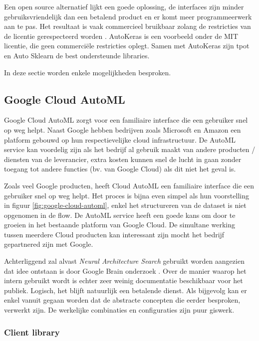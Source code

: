 Een open source alternatief lijkt een goede oplossing, de interfaces zijn minder gebruiksvriendelijk dan een betalend product en er komt meer programmeerwerk aan te pas. Het resultaat is vaak commercieel bruikbaar zolang de restricties van de licentie gerespecteerd worden \autocite{Balter2015}. AutoKeras is een voorbeeld onder de MIT licentie, die geen commerciële restricties oplegt. Samen met AutoKeras zijn tpot en Auto Sklearn de best ondersteunde libraries.

In deze sectie worden enkele mogelijkheden besproken.

\subsection{Google Cloud AutoML}
\label{subsec:google-automl}

Google Cloud AutoML zorgt voor een familiaire interface die een gebruiker snel op weg helpt. Naast Google hebben bedrijven zoals Microsoft en Amazon een platform gebouwd op hun respectievelijke cloud infrastructuur. De AutoML service kan voordelig zijn als het bedrijf al gebruik maakt van andere producten / diensten van de leverancier, extra kosten kunnen snel de lucht in gaan zonder toegang tot andere functies (bv. van Google Cloud) als dit niet het geval is. 

Zoals veel Google producten, heeft Cloud AutoML een familiaire interface die een gebruiker snel op weg helpt. Het proces is bijna even simpel als hun voorstelling in figuur \ref{fig:google-cloud-automl}, enkel het structureren van de dataset is niet opgenomen in de flow. De AutoML service heeft een goede kans om door te groeien in het bestaande platform van Google Cloud. De simultane werking tussen meerdere Cloud producten kan interessant zijn mocht het bedrijf gepartnered zijn met Google.

Achterliggend zal alvast \textit{Neural Architecture Search} gebruikt worden aangezien dat idee ontstaan is door Google Brain onderzoek \autocite{ZophL2016}. Over de manier waarop het intern gebruikt wordt is echter zeer weinig documentatie beschikbaar voor het publiek. Logisch, het blijft natuurlijk een betalende dienst. Als bijgevolg kan er enkel vanuit gegaan worden dat de abstracte concepten die eerder besproken, verwerkt zijn. De werkelijke combinaties en configuraties zijn puur giswerk. 

\subsubsection{Client library}
\label{subsubsec:client-library}


